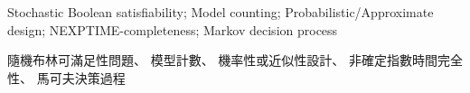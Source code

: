 




\newcommand{\myenglishkeywords}{
  Stochastic Boolean satisfiability;
  Model counting;
  Probabilistic/Approximate design;
  NEXPTIME-completeness;
  Markov decision process
}

\newcommand{\mychinesekeywords}{
  隨機布林可滿足性問題、
  模型計數、
  機率性或近似性設計、
  非確定指數時間完全性、
  馬可夫決策過程
}

\frontmatter
\begin{abstracten}{\myenglishkeywords}
  
\end{abstracten}
\begin{abstractzh}{\mychinesekeywords}
  
\end{abstractzh}
\begin{acknowledgements}
  
\end{acknowledgements}


\tableofcontents
\mainmatter










\listoffigures
\listoftables
\cleardoublepage
{}
{}
\listofalgorithms



